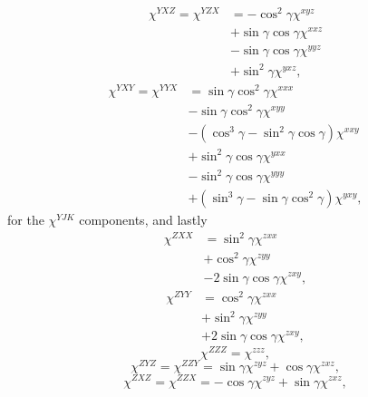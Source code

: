 \documentclass[aps,pra,10pt,amsmath,twocolumn,letterpaper]{revtex4-1}
\begin{document}
\begin{equation*}
\begin{split}
\chi^{YXZ} = \chi^{YZX}
&=
 - \cos^{2}\gamma        \chi^{xyz}\\
&+ \sin\gamma \cos\gamma \chi^{xxz}\\
&- \sin\gamma \cos\gamma \chi^{yyz}\\
&+ \sin^{2}\gamma        \chi^{yxz},
\end{split}
\end{equation*}
\begin{equation*}
\begin{split}
\chi^{YXY} = \chi^{YYX}
&= \sin\gamma \cos^{2}\gamma                    \chi^{xxx}\\
&- \sin\gamma \cos^{2}\gamma                    \chi^{xyy}\\
&- (\cos^{3}\gamma - \sin^{2}\gamma \cos\gamma) \chi^{xxy}\\
&+ \sin^{2}\gamma \cos\gamma                    \chi^{yxx}\\
&- \sin^{2}\gamma \cos\gamma                    \chi^{yyy}\\
&+ (\sin^{3}\gamma - \sin\gamma \cos^{2}\gamma) \chi^{yxy},
\end{split}
\end{equation*}
for the $\chi^{YJK}$ components, and lastly
\begin{equation*}
\begin{split}
\chi^{ZXX}
&=  \sin^{2}\gamma        \chi^{zxx}\\
&+  \cos^{2}\gamma        \chi^{zyy}\\
&- 2\sin\gamma \cos\gamma \chi^{zxy},
\end{split}
\end{equation*}
\begin{equation*}
\begin{split}
\chi^{ZYY}
&=  \cos^{2}\gamma        \chi^{zxx}\\
&+  \sin^{2}\gamma        \chi^{zyy}\\
&+ 2\sin\gamma \cos\gamma \chi^{zxy},
\end{split}
\end{equation*}
\begin{equation*}
\chi^{ZZZ} =  \chi^{zzz},
\end{equation*}
\begin{equation*}
\chi^{ZYZ} = \chi^{ZZY} = \sin\gamma \chi^{zyz} + \cos\gamma \chi^{zxz},
\end{equation*}
\begin{equation*}
\chi^{ZXZ} = \chi^{ZZX} = - \cos\gamma \chi^{zyz} + \sin\gamma \chi^{zxz},
\end{equation*}
\end{document}
